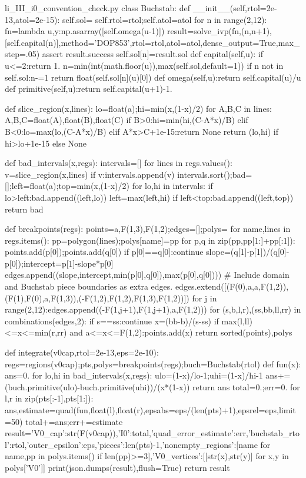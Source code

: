 \begin{filecontents*}[overwrite]{li_III_i0_convention_check.py}
class Buchstab:
    def __init__(self,rtol=2e-13,atol=2e-15):
        self.sol={}
        self.rtol=rtol;self.atol=atol
        for n in range(2,12):
            fn=lambda u,y:np.asarray([self.omega(u-1)])
            result=solve_ivp(fn,(n,n+1),[self.capital(n)],method='DOP853',rtol=rtol,atol=atol,dense_output=True,max_step=.05)
            assert result.success
            self.sol[n]=result.sol
    def capital(self,u):
        if u<=2:return 1.
        n=min(int(math.floor(u)),max(self.sol,default=1))
        if n not in self.sol:n-=1
        return float(self.sol[n](u)[0])
    def omega(self,u):return self.capital(u)/u
    def primitive(self,u):return self.capital(u+1)-1.

def slice_region(x,lines):
    lo=float(a);hi=min(x,(1-x)/2)
    for A,B,C in lines:
        A,B,C=float(A),float(B),float(C)
        if B>0:hi=min(hi,(C-A*x)/B)
        elif B<0:lo=max(lo,(C-A*x)/B)
        elif A*x>C+1e-15:return None
    return (lo,hi) if hi>lo+1e-15 else None

def bad_intervals(x,regs):
    intervals=[]
    for lines in regs.values():
        v=slice_region(x,lines)
        if v:intervals.append(v)
    intervals.sort();bad=[];left=float(a);top=min(x,(1-x)/2)
    for lo,hi in intervals:
        if lo>left:bad.append((left,lo))
        left=max(left,hi)
    if left<top:bad.append((left,top))
    return bad

def breakpoints(regs):
    points={a,F(1,3),F(1,2)};edges=[];polys={}
    for name,lines in regs.items():
        pp=polygon(lines);polys[name]=pp
        for p,q in zip(pp,pp[1:]+pp[:1]):
            points.add(p[0]);points.add(q[0])
            if p[0]==q[0]:continue
            slope=(q[1]-p[1])/(q[0]-p[0]);intercept=p[1]-slope*p[0]
            edges.append((slope,intercept,min(p[0],q[0]),max(p[0],q[0])))
    # Include domain and Buchstab piece boundaries as extra edges.
    edges.extend([(F(0),a,a,F(1,2)),(F(1),F(0),a,F(1,3)),(-F(1,2),F(1,2),F(1,3),F(1,2))])
    for j in range(2,12):edges.append((-F(1,j+1),F(1,j+1),a,F(1,2)))
    for (s,b,l,r),(ss,bb,ll,rr) in combinations(edges,2):
        if s==ss:continue
        x=(bb-b)/(s-ss)
        if max(l,ll)<=x<=min(r,rr) and a<=x<=F(1,2):points.add(x)
    return sorted(points),polys

def integrate(v0cap,rtol=2e-13,eps=2e-10):
    regs=regions(v0cap);pts,polys=breakpoints(regs);buch=Buchstab(rtol)
    def fun(x):
        ans=0.
        for lo,hi in bad_intervals(x,regs):
            ulo=(1-x)/lo-1;uhi=(1-x)/hi-1
            ans+=(buch.primitive(ulo)-buch.primitive(uhi))/(x*(1-x))
        return ans
    total=0.;err=0.
    for l,r in zip(pts[:-1],pts[1:]):
        ans,estimate=quad(fun,float(l),float(r),epsabs=eps/(len(pts)+1),epsrel=eps,limit=50)
        total+=ans;err+=estimate
    result={'V0_cap':str(F(v0cap)),'I0':total,'quad_error_estimate':err,'buchstab_rtol':rtol,'outer_epsilon':eps,'pieces':len(pts)-1,'nonempty_regions':[name for name,pp in polys.items() if len(pp)>=3],'V0_vertices':[[str(x),str(y)] for x,y in polys['V0']]}
    print(json.dumps(result),flush=True)
    return result


\end{filecontents*}
